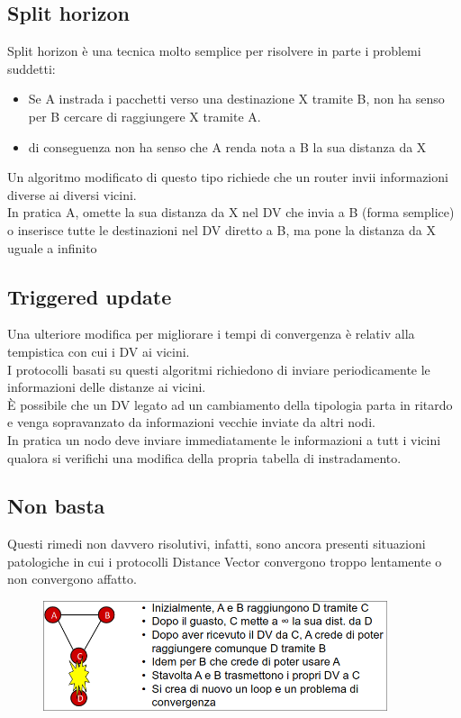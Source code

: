 \documentclass{report}
\begin{document}
            \subsection{Split horizon}
                Split horizon è una tecnica molto semplice per risolvere in parte i problemi suddetti:
                \begin{itemize}
                    \item Se A instrada i pacchetti verso una destinazione X tramite B, non ha senso per B cercare di raggiungere X tramite A.
                    \item di conseguenza non ha senso che A renda nota a B la sua distanza da X
                \end{itemize}
                Un algoritmo modificato di questo tipo richiede che un router invii informazioni diverse ai diversi vicini.
                \\
                In pratica A, omette la sua distanza da X nel DV che invia a B (forma semplice) o inserisce tutte le destinazioni nel DV diretto a B, ma pone la distanza da X uguale a infinito
            \subsection{Triggered update}
                Una ulteriore modifica per migliorare i tempi di convergenza è relativ alla tempistica con cui i DV ai vicini.
                \\
                I protocolli basati su questi algoritmi richiedono di inviare periodicamente le informazioni delle distanze ai vicini.
                \\
                È possibile che un DV legato ad un cambiamento della tipologia parta in ritardo e venga sopravanzato da informazioni vecchie inviate da altri nodi.
                \\
                In pratica un nodo deve inviare immediatamente le informazioni a tutt i vicini qualora si verifichi una modifica della propria tabella di instradamento.
            \subsection{Non basta}
                Questi rimedi non davvero risolutivi, infatti, sono ancora presenti situazioni patologiche in cui i protocolli Distance Vector convergono troppo lentamente o non convergono affatto.
                \begin{figure}[H]
                    \includegraphics[width=0.9\textwidth]{3/nBast.png}
                \end{figure}
\end{document}

